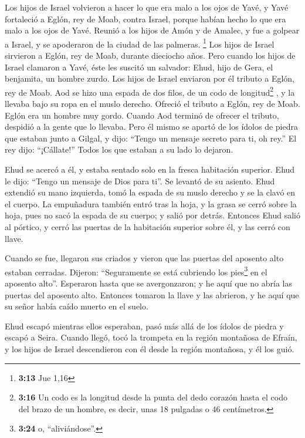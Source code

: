 \begin{paracol}{2}
 Los hijos de Israel volvieron a hacer lo que era malo a
los ojos de Yavé, y Yavé fortaleció a Eglón, rey de Moab, contra Israel,
porque habían hecho lo que era malo a los ojos de Yavé. 
Reunió a los hijos de Amón y de Amalec, y fue a golpear a Israel, y se
apoderaron de la ciudad de las palmeras. \footnote{\textbf{3:13} Jue
  1,16}  Los hijos de Israel sirvieron a Eglón, rey de
Moab, durante dieciocho años.  Pero cuando los hijos de
Israel clamaron a Yavé, éste les suscitó un salvador: Ehud, hijo de
Gera, el benjamita, un hombre zurdo. Los hijos de Israel enviaron por él
tributo a Eglón, rey de Moab.  Aod se hizo una espada de
dos filos, de un codo de longitud\footnote{\textbf{3:16} Un codo es la
  longitud desde la punta del dedo corazón hasta el codo del brazo de un
  hombre, es decir, unas 18 pulgadas o 46 centímetros.} , y la llevaba
bajo su ropa en el muslo derecho.  Ofreció el tributo a
Eglón, rey de Moab. Eglón era un hombre muy gordo. 
Cuando Aod terminó de ofrecer el tributo, despidió a la gente que lo
llevaba.  Pero él mismo se apartó de los ídolos de piedra
que estaban junto a Gilgal, y dijo: ``Tengo un mensaje secreto para ti,
oh rey.'' El rey dijo: ``¡Cállate!'' Todos los que estaban a su lado lo
dejaron.

 Ehud se acercó a él, y estaba sentado solo en la fresca
habitación superior. Ehud le dijo: ``Tengo un mensaje de Dios para ti''.
Se levantó de su asiento.  Ehud extendió su mano
izquierda, tomó la espada de su muslo derecho y se la clavó en el
cuerpo.  La empuñadura también entró tras la hoja, y la
grasa se cerró sobre la hoja, pues no sacó la espada de su cuerpo; y
salió por detrás.  Entonces Ehud salió al pórtico, y
cerró las puertas de la habitación superior sobre él, y las cerró con
llave.

 Cuando se fue, llegaron sus criados y vieron que las
puertas del aposento alto estaban cerradas. Dijeron: ``Seguramente se
está cubriendo los pies\footnote{\textbf{3:24} o, ``aliviándose''.} en
el aposento alto''.  Esperaron hasta que se avergonzaron;
y he aquí que no abría las puertas del aposento alto. Entonces tomaron
la llave y las abrieron, y he aquí que su señor había caído muerto en el
suelo.

 Ehud escapó mientras ellos esperaban, pasó más allá de
los ídolos de piedra y escapó a Seira.  Cuando llegó,
tocó la trompeta en la región montañosa de Efraín, y los hijos de Israel
descendieron con él desde la región montañosa, y él los guió.


\end{paracol}
